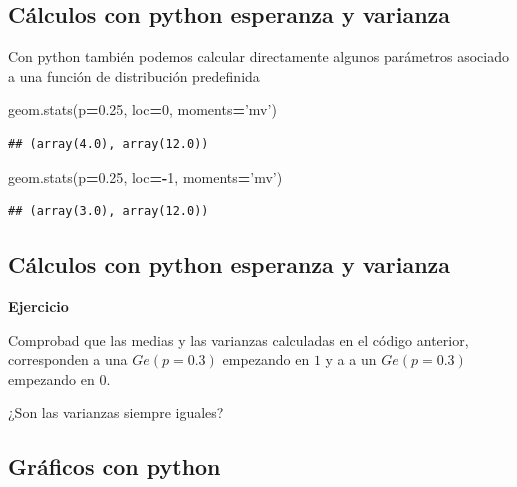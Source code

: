 \documentclass[]{book}
\newenvironment{Shaded}{\begin{snugshade}}{\end{snugshade}}
\newcommand{\DecValTok}[1]{\textcolor[rgb]{0.00,0.00,0.81}{#1}}
\newcommand{\FloatTok}[1]{\textcolor[rgb]{0.00,0.00,0.81}{#1}}
\newcommand{\NormalTok}[1]{#1}
\newcommand{\OperatorTok}[1]{\textcolor[rgb]{0.81,0.36,0.00}{\textbf{#1}}}
\newcommand{\StringTok}[1]{\textcolor[rgb]{0.31,0.60,0.02}{#1}}
\begin{document}
\hypertarget{cuxe1lculos-con-python-esperanza-y-varianza}{%
\subsection{Cálculos con python esperanza y varianza}\label{cuxe1lculos-con-python-esperanza-y-varianza}}

Con python también podemos calcular directamente algunos parámetros asociado a una función de distribución predefinida

\begin{Shaded}
\begin{Highlighting}[]
\NormalTok{geom.stats(p}\OperatorTok{=}\FloatTok{0.25}\NormalTok{, loc}\OperatorTok{=}\DecValTok{0}\NormalTok{, moments}\OperatorTok{=}\StringTok{'mv'}\NormalTok{)}
\end{Highlighting}
\end{Shaded}

\begin{verbatim}
## (array(4.0), array(12.0))
\end{verbatim}

\begin{Shaded}
\begin{Highlighting}[]
\NormalTok{geom.stats(p}\OperatorTok{=}\FloatTok{0.25}\NormalTok{, loc}\OperatorTok{=-}\DecValTok{1}\NormalTok{, moments}\OperatorTok{=}\StringTok{'mv'}\NormalTok{)}
\end{Highlighting}
\end{Shaded}

\begin{verbatim}
## (array(3.0), array(12.0))
\end{verbatim}

\hypertarget{cuxe1lculos-con-python-esperanza-y-varianza-1}{%
\subsection{Cálculos con python esperanza y varianza}\label{cuxe1lculos-con-python-esperanza-y-varianza-1}}

\textbf{Ejercicio}

Comprobad que las medias y las varianzas calculadas en el código anterior, corresponden a una \(Ge(p=0.3)\) empezando en \(1\) y a a un \(Ge(p=0.3)\)
empezando en \(0\).

¿Son las varianzas siempre iguales?

\hypertarget{gruxe1ficos-con-python}{%
\subsection{Gráficos con python}\label{gruxe1ficos-con-python}}
\end{document}
